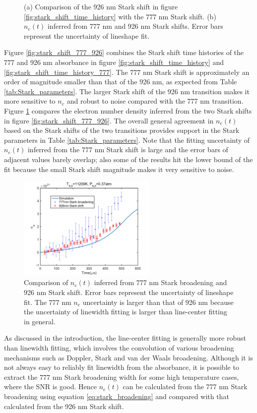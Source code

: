 \documentclass[12pt]{iopart}
\begin{document}
\begin{figure}[h]
\begin{subfigure}[b]{0.4\textwidth}
    \caption{\label{fig:ne_777_926} }
   \end{subfigure}   
       \caption{\label{fig:compare_777_926} (a) Comparison of the 926 nm Stark shift in figure \ref{fig:stark_shift_time_history} with the 777 nm Stark shift. (b) $n_e(t)$ inferred from 777 nm and 926 nm Stark shifts.  Error bars represent the uncertainty of lineshape fit.}
\end{figure}
Figure \ref{fig:stark_shift_777_926} combines the Stark shift time histories of the 777 and 926 nm absorbance in figure \ref{fig:stark_shift_time_history} and \ref{fig:stark_shift_time_history_777}. The 777 nm Stark shift is approximately an order of magnitude smaller than that of the 926 nm, as expected from Table \ref{tab:Stark_parameters}. The larger Stark shift of the 926 nm transition makes it more sensitive to $n_e$ and robust to noise compared with the 777 nm transition. Figure \ref{fig:ne_777_926} compares the electron number density inferred from the two Stark shifts in figure \ref{fig:stark_shift_777_926}. The overall general agreement in $n_e(t)$ based on the Stark shifts of the two transitions provides support in the Stark parameters in Table \ref{tab:Stark_parameters}. Note that the fitting uncertainty of $n_e(t)$ inferred from the 777 nm Stark shift is large and the error bars of adjacent values barely overlap; also some of the results hit the lower bound of the fit because the small Stark shift magnitude makes it very sensitive to noise. 

\begin{figure}
    \centering
    \includegraphics[width = 0.6\textwidth]{11209K_037atm_ne_sim_777Broadening_926.png}
    \caption{Comparison of $n_e(t)$ inferred from 777 nm Stark broadening and 926 nm Stark shift.  Error bars represent the uncertainty of lineshape fit.  The 777 nm $n_e$ uncertainty is larger than that of 926 nm because the uncertainty of linewidth fitting is larger than line-center fitting in general.  \label{fig:ne_777broadening_926}}
\end{figure}
As discussed in the introduction, the line-center fitting is generally more robust than linewidth fitting, which involves the convolution of various broadening mechanisms such as Doppler, Stark and van der Waals broadening.  Although it is not  always easy to reliably fit linewidth from the absorbance, it is possible to extract the 777 nm Stark broadening width for some high temperature cases, where the SNR is good. Hence $n_e(t)$ can be calculated from the 777 nm Stark broadening using equation \ref{eq:stark_broadening} and compared with that calculated from the 926 nm Stark shift. 
\end{document}
